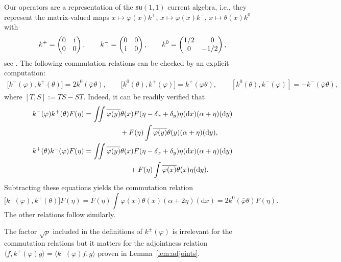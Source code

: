 \documentclass[11pt]{article}
\numberwithin{equation}{section}
\numberwithin{equation}{section}
\newcommand{\dd}{\mathrm{d}} %
\newcommand{\la}{\langle}
\newcommand{\ra}{\rangle}
\newcommand{\1}{\mathbbm{1}}
\begin{document}
Our operators are a representation of the $\mathfrak{su}(1,1)$ current algebra, i.e., they represent the matrix-valued maps $x\mapsto \varphi(x) k^+$, $x\mapsto \overline{\varphi(x)} k^-$, $x\mapsto \theta(x) k^0$ with
\begin{align*}
 	k^+ = \begin{pmatrix} 0 & \mathrm i \\ 0 & 0 \end{pmatrix},\qquad
	k^- = \begin{pmatrix} 0 & 0 \\ \mathrm i & 0 \end{pmatrix},\qquad
	k^0 = \begin{pmatrix} 1/2 & \hphantom{-}0 \\ 0 & -1/2 \end{pmatrix},
\end{align*}
see \cite[Section~2.2]{algebraic_Floreani}.
The following commutation relations can be checked by an explicit computation:
\begin{gather*}
	\bigl[k^-(\varphi), k^+(\theta)\bigr] = 2 k^0(\overline{\varphi}\theta),\qquad
\bigl[k^0(\theta),k^+(\varphi)\bigr] = k^+(\varphi\theta),\qquad [k^0(\theta),k^-(\varphi)] = - k^-(\overline{\varphi}\theta),
\end{gather*}
where $[T, S] := TS - ST$.
Indeed, it can be readily verified that
\begin{gather*}
 k^-(\varphi) k^+(\theta) F(\eta) = \iint \overline{\varphi(y)} \theta(x) F(\eta - \delta_x + \delta_y) \eta(\dd x) (\alpha + \eta)(\dd y) \\
 \hphantom{k^-(\varphi) k^+(\theta) F(\eta) = \iint}{}
 + F(\eta) \int \overline{\varphi(y)} \theta(y) (\alpha + \eta)(\dd y), \\
 k^+(\theta) k^-(\varphi) F(\eta) = \iint \overline{\varphi(y)} \theta(x) F(\eta - \delta_x + \delta_y) \eta(\dd x) (\alpha + \eta)(\dd y) \\
 \hphantom{k^+(\theta) k^-(\varphi) F(\eta) =\iint}{}
 + F(\eta) \int \overline{\varphi(x)} \theta(x) \eta(\dd y).
\end{gather*}
Subtracting these equations yields the commutation relation
\[
\bigl[k^-(\varphi), k^+(\theta)\bigr] F(\eta) = F(\eta) \int \overline{\varphi(x)} \theta(x) (\alpha + 2\eta)(\dd x) = 2k^0(\overline{\varphi}\theta) F(\eta).
\]
 The other relations follow similarly.

The factor $\sqrt p$ included in the definitions of $k^\pm(\varphi)$ is irrelevant for the commutation relations but it matters for the adjointness relation $\la f, k^+(\varphi) g\ra = \la k^-(\varphi) f,g\ra$ proven in Lemma~\ref{lem:adjoints}.
\end{document}
